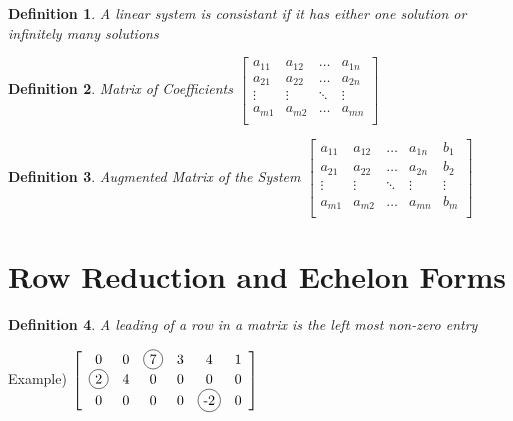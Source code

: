 \documentclass[a4paper,12pt]{book}
\newcommand*\circled[1]{\tikz[baseline=(char.base)]{
            \node[shape=circle,draw,inner sep=2pt] (char) {#1};}}
\theoremstyle{defn}
\newtheorem{defn}{Definition}[section]
\theoremstyle{expl}
\begin{document}
\begin{defn}\textup{A linear system is consistant if it has either one solution or infinitely many solutions}\end{defn}

\begin{defn}\textup{Matrix of Coefficients} 
$\left[ \begin{array}{cccc}
a_{11} & a_{12} & \ldots & a_{1n}\\
a_{21} & a_{22} & \ldots & a_{2n}\\
\vdots &\vdots&\ddots& \vdots\\
a_{m1} & a_{m2} & \ldots & a_{mn}\\
\end{array} \right]$ \end{defn}


\begin{defn}\textup{Augmented Matrix of the System}
$\left[ \begin{array}{cccc|c}
a_{11} & a_{12} & \ldots & a_{1n} & b_1\\
a_{21} & a_{22} & \ldots & a_{2n} & b_2\\
\vdots &\vdots&\ddots& \vdots &\vdots\\
a_{m1} & a_{m2} & \ldots & a_{mn} & b_m\\
\end{array}\right]$ \end{defn}


\section{Row Reduction and Echelon Forms}
\begin{defn}\textup{A leading  of a row in a matrix is the left most non-zero entry} \end{defn}
Example) $\left[ \begin{array}{cccccc} 0 & 0 & \circled{7} & 3 & 4 & 1\\ \circled{2} & 4 & 0 &0 &0 &0 \\ 0 &0 &0 &0 &\circled{-2} &0 \end{array} \right] $

\end{document}
